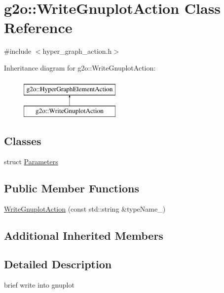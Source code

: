 \hypertarget{classg2o_1_1_write_gnuplot_action}{}\section{g2o\+:\+:Write\+Gnuplot\+Action Class Reference}
\label{classg2o_1_1_write_gnuplot_action}


{\ttfamily \#include $<$hyper\+\_\+graph\+\_\+action.\+h$>$}

Inheritance diagram for g2o\+:\+:Write\+Gnuplot\+Action\+:\begin{figure}[H]
\begin{center}
\leavevmode
\includegraphics[height=2.000000cm]{classg2o_1_1_write_gnuplot_action}
\end{center}
\end{figure}
\subsection*{Classes}
\begin{DoxyCompactItemize}
\item 
struct \mbox{\hyperlink{structg2o_1_1_write_gnuplot_action_1_1_parameters}{Parameters}}
\end{DoxyCompactItemize}
\subsection*{Public Member Functions}
\begin{DoxyCompactItemize}
\item 
\mbox{\hyperlink{classg2o_1_1_write_gnuplot_action_abfae045b16ae760f6d0c7feefe4b751f}{Write\+Gnuplot\+Action}} (const std\+::string \&type\+Name\+\_\+)
\end{DoxyCompactItemize}
\subsection*{Additional Inherited Members}


\subsection{Detailed Description}
brief write into gnuplot 

